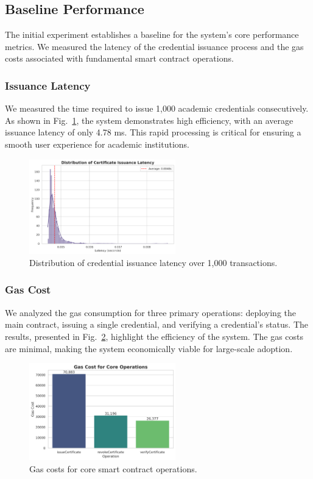 \documentclass[lettersize,journal]{IEEEtran}
\begin{document}
\begin{itemize}
\subsection{Baseline Performance}
The initial experiment establishes a baseline for the system's core performance metrics. We measured the latency of the credential issuance process and the gas costs associated with fundamental smart contract operations.

\subsubsection{Issuance Latency}
We measured the time required to issue 1,000 academic credentials consecutively. As shown in Fig.~\ref{fig:issuance_latency}, the system demonstrates high efficiency, with an average issuance latency of only 4.78 ms. This rapid processing is critical for ensuring a smooth user experience for academic institutions.

\begin{figure}[!t]
\centering
\includegraphics[width=2.5in]{figures/fig1a_issuance_latency.png}
\caption{Distribution of credential issuance latency over 1,000 transactions.}
\label{fig:issuance_latency}
\end{figure}

\subsubsection{Gas Cost}
We analyzed the gas consumption for three primary operations: deploying the main contract, issuing a single credential, and verifying a credential's status. The results, presented in Fig.~\ref{fig:gas_cost}, highlight the efficiency of the system. The gas costs are minimal, making the system economically viable for large-scale adoption.

\begin{figure}[!t]
\centering
\includegraphics[width=2.5in]{figures/fig1b_gas_cost.png}
\caption{Gas costs for core smart contract operations.}
\label{fig:gas_cost}
\end{figure}


\end{itemize}
\end{document}
